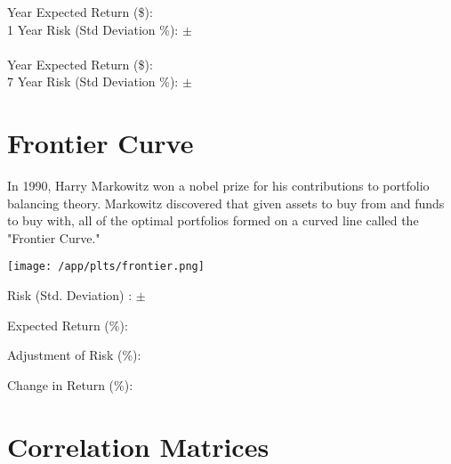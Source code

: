 \documentclass{article}
\begin{document}
 Year Expected Return (\$): {} \quad \emph{{}}\\
1 Year Risk (Std Deviation \%): $\pm$ {}
\\ \\
 Year Expected Return (\$): {} \quad \emph{{}}\\
7 Year Risk (Std Deviation \%): $\pm$ {}



\newpage    %



\section{Frontier Curve}

In 1990, Harry Markowitz won a nobel prize for his contributions to portfolio balancing theory. Markowitz discovered that given assets to buy from and funds to buy with, all of the optimal portfolios formed on a curved line called the "Frontier Curve."

\vspace{2cm}

\hspace*{-2.5cm}\texttt{[image: /app/plts/frontier.png]}\par

\vspace{1cm}


Risk (Std. Deviation) : $\pm$ {}

Expected Return (\%): {}

Adjustment of Risk (\%): {}

Change in Return (\%): {}


\newpage    %

\section{Correlation Matrices}

\vspace{1cm}
\end{document}
